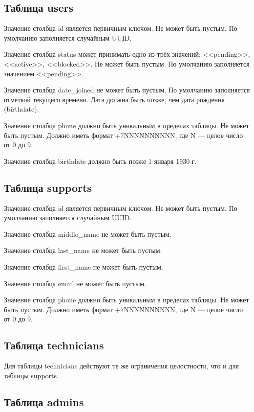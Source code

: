 \subsection{Таблица users}

Значение столбца id является первичным ключом. Не может быть пустым. По умолчанию заполняется случайным UUID.

Значение столбца status может принимать одно из трёх значений: <<pending>>, <<active>>, <<blocked>>. Не может быть пустым. По умолчанию заполняется значением <<pending>>.

Значение столбца date\_joined не может быть пустым. По умолчанию заполняется отметкой текущего времени. Дата должна быть позже, чем дата рождения (birthdate).

Значение столбца phone должно быть уникальным в пределах таблицы. Не может быть пустым. Должно иметь формат +7NNNNNNNNNN, где N --- целое число от 0 до 9.

Значение столбца birthdate должно быть позже 1 января 1930 г.

\subsection{Таблица supports}

Значение столбца id является первичным ключом. Не может быть пустым. По умолчанию заполняется случайным UUID.

Значение столбца middle\_name не может быть пустым.

Значение столбца last\_name не может быть пустым.

Значение столбца first\_name не может быть пустым.

Значение столбца email не может быть пустым.

Значение столбца phone должно быть уникальным в пределах таблицы. Не может быть пустым. Должно иметь формат +7NNNNNNNNNN, где N --- целое число от 0 до 9.

\subsection{Таблица technicians}

Для таблицы technicians действуют те же ограничения целостности, что и для таблицы supports.

\subsection{Таблица admins}

